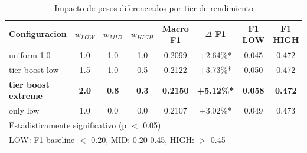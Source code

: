 \begin{table}[h]
\centering
\caption{Impacto de pesos diferenciados por tier de rendimiento}
\label{tab:weight_by_tier}
\begin{tabular}{lccccccc}
\hline
Configuracion & $w_{LOW}$ & $w_{MID}$ & $w_{HIGH}$ & Macro F1 & $\Delta$ F1 & F1 LOW & F1 HIGH \\
\hline
uniform 1.0 & 1.0 & 1.0 & 1.0 & 0.2099 & +2.64\%* & 0.045 & 0.472 \\
tier boost low & 1.5 & 1.0 & 0.5 & 0.2122 & +3.73\%* & 0.050 & 0.472 \\
\textbf{tier boost extreme} & \textbf{2.0} & \textbf{0.8} & \textbf{0.3} & \textbf{0.2150} & \textbf{+5.12\%*} & \textbf{0.058} & \textbf{0.472} \\
only low & 1.0 & 0.0 & 0.0 & 0.2107 & +3.02\%* & 0.049 & 0.473 \\
\hline
\multicolumn{8}{l}{\footnotesize *Estadisticamente significativo (p $<$ 0.05)}\\
\multicolumn{8}{l}{\footnotesize LOW: F1 baseline $<$ 0.20, MID: 0.20-0.45, HIGH: $>$ 0.45}\\
\end{tabular}
\end{table}
